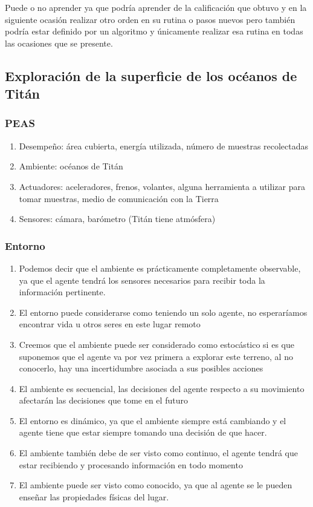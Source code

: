 \documentclass{article}
\begin{document}
                Puede o no aprender ya que podría aprender de la calificación que obtuvo y en la siguiente ocasión realizar otro orden en su rutina o pasos nuevos pero también podría estar definido por un algoritmo y únicamente realizar esa rutina en todas las ocasiones que se presente.

        \subsection{Exploración de la superficie de los océanos de Titán}

            \subsubsection{PEAS}
                \begin{enumerate}
                    \item Desempeño: área cubierta, energía utilizada, número de muestras recolectadas
                    \item Ambiente: océanos de Titán
                    \item Actuadores: aceleradores, frenos, volantes, alguna herramienta a utilizar para tomar muestras, medio de comunicación con la Tierra
                    \item Sensores: cámara, barómetro (Titán tiene atmósfera)
            \end{enumerate}

            \subsubsection{Entorno}
                \begin{enumerate}
                    \item Podemos decir que el ambiente es prácticamente completamente  observable, ya que el agente tendrá los sensores necesarios para recibir toda la información pertinente.
                    \item El entorno puede considerarse como teniendo un solo agente, no esperaríamos encontrar vida u otros seres en este lugar remoto
                    \item Creemos que el ambiente puede ser considerado como estocástico si es que suponemos que el agente va por vez primera a explorar este terreno, al no conocerlo, hay una incertidumbre asociada a sus posibles acciones
                    \item El ambiente es secuencial, las decisiones del agente respecto a su movimiento afectarán las decisiones que tome en el futuro
                    \item El entorno es dinámico, ya que el ambiente siempre está cambiando y el agente tiene que estar siempre tomando una decisión de que hacer. 
                    \item El ambiente también debe de ser visto como continuo, el agente tendrá que estar recibiendo y procesando información en todo momento
                    \item El ambiente puede ser visto como conocido, ya que al agente se le pueden enseñar las propiedades físicas del lugar.
                \end{enumerate}
\end{document}
